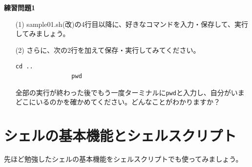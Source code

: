 \documentclass[a4j]{ltjsreport}
\begin{document}


    \begin{itembox}[l]{\textbf{練習問題1}}
        \begin{itemize}
            \item[(1)] sample01.sh(改)の4行目以降に、好きなコマンドを入力・保存して、実行してみましょう。
            \item[(2)] さらに、次の2行を加えて保存・実行してみてください。
            \begin{lstlisting}[numbers=none]
                cd ..
                pwd
            \end{lstlisting}
            全部の実行が終わった後でもう一度ターミナルに\texttt{pwd}と入力し、自分がいまどこにいるのかを確かめてください。どんなことがわかりますか？
        \end{itemize}
    \end{itembox}

    \newpage
    \section{シェルの基本機能とシェルスクリプト}
    先ほど勉強したシェルの基本機能をシェルスクリプトでも使ってみましょう。
\end{document}
